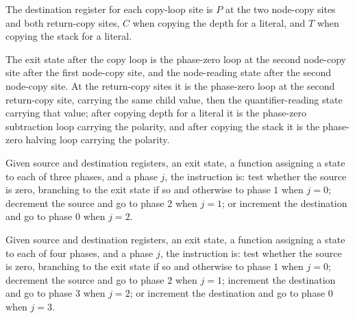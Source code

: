\begin{definition}
\label{Complexity.LogProg.TQBFARM.cpDst}
\leanok
{}
The destination register for each copy-loop site is $P$ at the two node-copy sites and
both return-copy sites, $C$ when copying the depth for a literal, and $T$ when copying
the stack for a literal.
\end{definition}

\begin{definition}
\label{Complexity.LogProg.TQBFARM.cpExit}
\leanok
{}
The exit state after the copy loop is the phase-zero loop at the second node-copy site
after the first node-copy site, and the node-reading state after the second node-copy
site. At the return-copy sites it is the phase-zero loop at the second return-copy site,
carrying the same child value, then the quantifier-reading state carrying that value;
after copying depth for a literal it is the phase-zero subtraction loop carrying the
polarity, and after copying the stack it is the phase-zero halving loop carrying the
polarity.
\end{definition}

\begin{definition}
\label{Complexity.LogProg.TQBFARM.mvI}
\leanok
{}
Given source and destination registers, an exit state, a function assigning a state to
each of three phases, and a phase $j$, the instruction is: test whether the source is
zero, branching to the exit state if so and otherwise to phase $1$ when $j=0$; decrement
the source and go to phase $2$ when $j=1$; or increment the destination and go to phase
$0$ when $j=2$.
\end{definition}

\begin{definition}
\label{Complexity.LogProg.TQBFARM.dmI}
\leanok
{}
Given source and destination registers, an exit state, a function assigning a state to
each of four phases, and a phase $j$, the instruction is: test whether the source is
zero, branching to the exit state if so and otherwise to phase $1$ when $j=0$; decrement
the source and go to phase $2$ when $j=1$; increment the destination and go to phase $3$
when $j=2$; or increment the destination and go to phase $0$ when $j=3$.
\end{definition}

